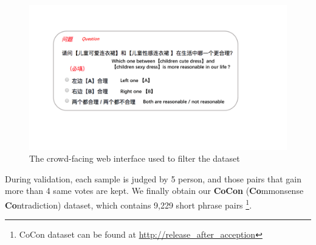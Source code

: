 \begin{figure}
	\centering
	\includegraphics[width=0.95\columnwidth]{images/crowdPage.pdf}
	\caption{The crowd-facing web interface used to filter the dataset}
	\label{fig:crowd}
\end{figure}

During validation, each sample is judged by 5 person, and those pairs that gain more than 4 same votes are kept. %
We finally obtain our \textbf{CoCon} (\textbf{Co}mmonsense \textbf{Co}ntradiction) dataset, which contains 9,229 short phrase pairs \footnote{CoCon dataset can be found at \url{http://release_after_acception}}.


